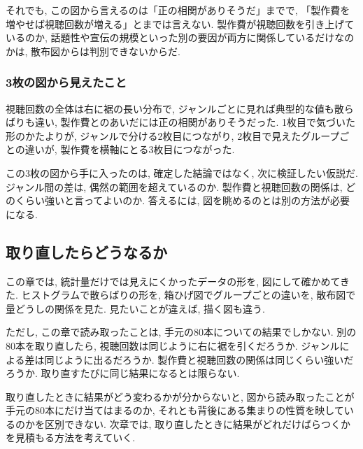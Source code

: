       それでも, この図から言えるのは「正の相関がありそうだ」までで, 「製作費を増やせば視聴回数が増える」とまでは言えない.
      製作費が視聴回数を引き上げているのか, 話題性や宣伝の規模といった別の要因が両方に関係しているだけなのかは, 散布図からは判別できないからだ.

    \subsubsection*{3枚の図から見えたこと}

      視聴回数の全体は右に裾の長い分布で, ジャンルごとに見れば典型的な値も散らばりも違い, 製作費とのあいだには正の相関がありそうだった.
      1枚目で気づいた形のかたよりが, ジャンルで分ける2枚目につながり, 2枚目で見えたグループごとの違いが, 製作費を横軸にとる3枚目につながった.

      この3枚の図から手に入ったのは, 確定した結論ではなく, 次に検証したい仮説だ.
      ジャンル間の差は, 偶然の範囲を超えているのか.
      製作費と視聴回数の関係は, どのくらい強いと言ってよいのか.
      答えるには, 図を眺めるのとは別の方法が必要になる.


  \subsection{取り直したらどうなるか}

    この章では, 統計量だけでは見えにくかったデータの形を, 図にして確かめてきた.
    ヒストグラムで散らばりの形を, 箱ひげ図でグループごとの違いを, 散布図で量どうしの関係を見た.
    見たいことが違えば, 描く図も違う.

    ただし, この章で読み取ったことは, 手元の80本についての結果でしかない.
    別の80本を取り直したら, 視聴回数は同じように右に裾を引くだろうか.
    ジャンルによる差は同じように出るだろうか.
    製作費と視聴回数の関係は同じくらい強いだろうか.
    取り直すたびに同じ結果になるとは限らない.

    取り直したときに結果がどう変わるかが分からないと, 図から読み取ったことが手元の80本にだけ当てはまるのか, それとも背後にある集まりの性質を映しているのかを区別できない.
    次章では, 取り直したときに結果がどれだけばらつくかを見積もる方法を考えていく.
